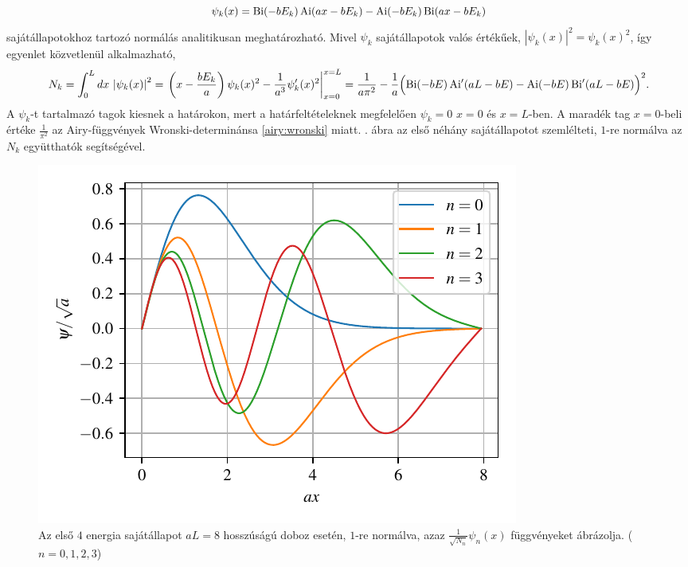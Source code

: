 \begin{equation}
	\psi_k(x) = \operatorname{Bi}(-bE_k)\operatorname{Ai}(ax-bE_k) - \operatorname{Ai}(-bE_k)\operatorname{Bi}(ax-bE_k)
\end{equation}
sajátállapotokhoz tartozó normálás analitikusan meghatározható. Mivel $\psi_k$ sajátállapotok valós értékűek, $\left|\psi_k(x)\right|^2 = \psi_k(x)^2$, így  egyenlet közvetlenül alkalmazható,
\begin{dmath}
	N_k = \int_0^Ldx\,\left|\psi_k(x)\right|^2 = \left.\left(x-\frac{bE_k}{a}\right)\psi_k(x)^2 - \frac{1}{a^3}\psi_k^\prime(x)^2\right|_{x=0}^{x=L} = \frac{1}{a\pi^2}-\frac{1}{a}\Bigl(\Bi(-bE)\Aip(aL-bE)-\Ai(-bE)\Bip(aL-bE)\Bigr)^2.
\end{dmath}
A $\psi_k$-t tartalmazó tagok kiesnek a határokon, mert a határfeltételeknek megfelelően $\psi_k=0$ $x=0$ és $x=L$-ben. A maradék tag $x=0$-beli értéke $\frac{1}{\pi^2}$ az Airy-függvények Wronski-determinánsa \eqref{airy:wronski} miatt. . ábra az első néhány sajátállapotot szemlélteti,  $1$-re normálva az $N_k$ együtthatók segítségével.
\begin{figure}[H]
	\centering
	\includegraphics[scale=1]{./figs/allapotok.pdf}
	\caption[Sajátállapotok]{Az első $4$ energia sajátállapot $aL=8$ hosszúságú doboz esetén, $1$-re normálva, azaz $\frac{1}{\sqrt{N_n}}\psi_n(x)$ függvényeket ábrázolja. ($n=0,1,2,3$)}
	\label{vegesf:eigenstates}
\end{figure}
	
